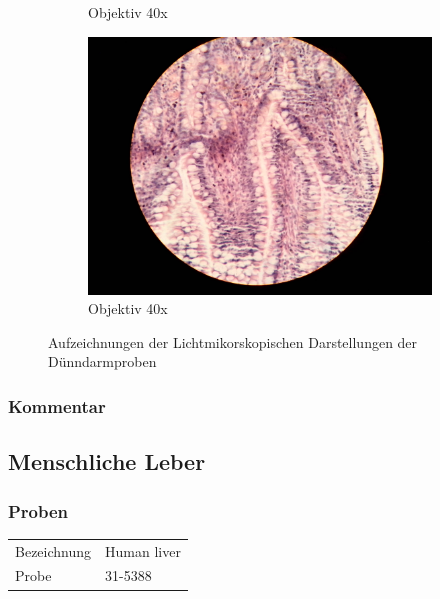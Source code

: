 \begin{figure}[h!]
\begin{subfigure}[b]{0.3\textwidth}
		\caption{Objektiv 40x}
	\end{subfigure}
	\begin{subfigure}[b]{0.3\textwidth}
		\includegraphics[angle=270, width=1\textwidth]{../images/06_mammal_illeum.jpg}
		\caption{Objektiv 40x}
	\end{subfigure}
	\caption{Aufzeichnungen der Lichtmikorskopischen Darstellungen der
		Dünndarmproben}
\end{figure}

\subsubsection{Kommentar}

\newpage
\subsection{Menschliche Leber}

\subsubsection{Proben}
\begin{table}[h!]
	\centering
	\begin{tabular}{l l}
		Bezeichnung	& Human liver \\
		Probe 		& 31-5388
	\end{tabular}
\end{table}

